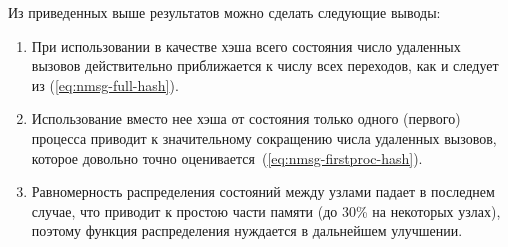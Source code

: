 
Из приведенных выше результатов можно сделать следующие выводы:

\begin{enumerate}
\item При использовании в качестве  хэша всего состояния число
  удаленных вызовов действительно приближается к числу всех переходов, как и
  следует из (\ref{eq:nmsg-full-hash}).

\item Использование вместо нее хэша от состояния только одного (первого)
  процесса приводит к значительному сокращению числа удаленных
  вызовов, которое довольно точно оценивается~(\ref{eq:nmsg-firstproc-hash}).

\item Равномерность распределения состояний между узлами падает в последнем
  случае, что приводит к простою части памяти  (до 30\% на некоторых узлах),
  поэтому функция распределения нуждается в дальнейшем улучшении.
\end{enumerate}






